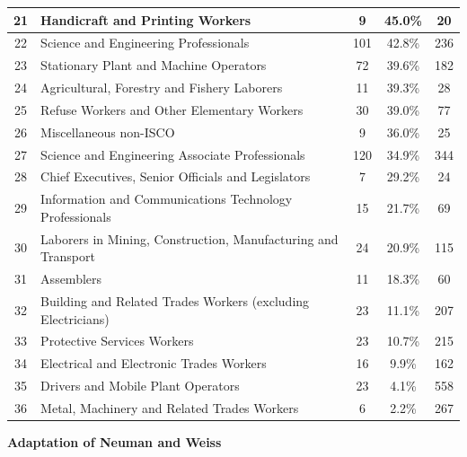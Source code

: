 \documentclass[alpha-refs]{wiley-article-02b}
\begin{document}
\begin{table}[!ht]
\begin{small}
\begin{tabular}{cp{10cm}ccc}
				21 & Handicraft and Printing Workers & 9 & 45.0\% &  20 \\ \hline
				22 & Science and Engineering Professionals & 101 & 42.8\% & 236 \\ 
				23 & Stationary Plant and Machine Operators & 72 & 39.6\% & 182 \\ 
				24 & Agricultural, Forestry and Fishery Laborers & 11 & 
				39.3\% &  28 \\ 
				25 & Refuse Workers and Other Elementary Workers & 30 & 39.0\% &  77 \\ 
				26 & Miscellaneous non-ISCO & 9 & 36.0\% &  25 \\ 
				27 & Science and Engineering Associate Professionals & 120 & 34.9\% & 344 \\ 
				28 & Chief Executives, Senior Officials and Legislators & 7 & 29.2\% &  24 \\ 
				29 & Information and Communications Technology Professionals & 15 & 21.7\% &  69 \\ 
				30 & Laborers in Mining, Construction, Manufacturing and 
				Transport & 24 & 20.9\% & 115 \\ 
				31 & Assemblers & 11 & 18.3\% &  60 \\ 
				32 & Building and Related Trades Workers (excluding Electricians) & 23 & 11.1\% & 207 \\ 
				33 & Protective Services Workers & 23 & 10.7\% & 215 \\ 
				34 & Electrical and Electronic Trades Workers & 16 & 9.9\% & 162 \\ 
				35 & Drivers and Mobile Plant Operators & 23 & 4.1\% & 558 \\ 
				36 & Metal, Machinery and Related Trades Workers & 6 & 2.2\% & 267 \\ 
				\hline
			\end{tabular}
		\end{small}
	\end{table}



\hspace{-1.8em} \textbf{Adaptation of Neuman and Weiss}
\end{document}
